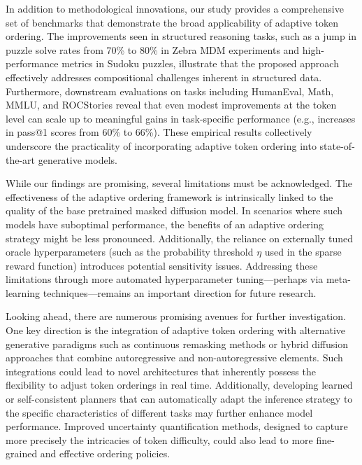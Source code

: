 \documentclass{article}
\begin{document}
\par In addition to methodological innovations, our study provides a comprehensive set of benchmarks that demonstrate the broad applicability of adaptive token ordering. The improvements seen in structured reasoning tasks, such as a jump in puzzle solve rates from 70\% to 80\% in Zebra MDM experiments and high-performance metrics in Sudoku puzzles, illustrate that the proposed approach effectively addresses compositional challenges inherent in structured data. Furthermore, downstream evaluations on tasks including HumanEval, Math, MMLU, and ROCStories reveal that even modest improvements at the token level can scale up to meaningful gains in task-specific performance (e.g., increases in pass@1 scores from 60\% to 66\%). These empirical results collectively underscore the practicality of incorporating adaptive token ordering into state-of-the-art generative models.

\par While our findings are promising, several limitations must be acknowledged. The effectiveness of the adaptive ordering framework is intrinsically linked to the quality of the base pretrained masked diffusion model. In scenarios where such models have suboptimal performance, the benefits of an adaptive ordering strategy might be less pronounced. Additionally, the reliance on externally tuned oracle hyperparameters (such as the probability threshold \(\eta\) used in the sparse reward function) introduces potential sensitivity issues. Addressing these limitations through more automated hyperparameter tuning—perhaps via meta-learning techniques—remains an important direction for future research.

\par Looking ahead, there are numerous promising avenues for further investigation. One key direction is the integration of adaptive token ordering with alternative generative paradigms such as continuous remasking methods or hybrid diffusion approaches that combine autoregressive and non-autoregressive elements. Such integrations could lead to novel architectures that inherently possess the flexibility to adjust token orderings in real time. Additionally, developing learned or self-consistent planners that can automatically adapt the inference strategy to the specific characteristics of different tasks may further enhance model performance. Improved uncertainty quantification methods, designed to capture more precisely the intricacies of token difficulty, could also lead to more fine-grained and effective ordering policies.
\end{document}
